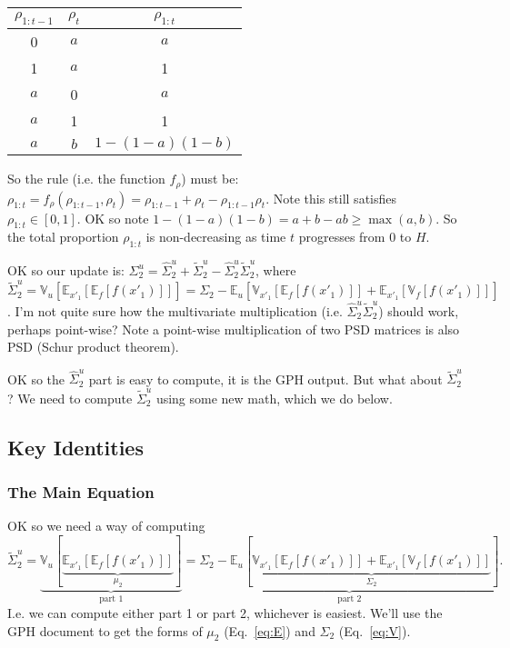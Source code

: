 \documentclass[a4paper,10pt]{article}
\newcommand{\E}{\mathbb{E}}
\newcommand{\V}{\mathbb{V}}
\begin{document}
\begin{itemize}
 \begin{tabular}{ c | c || c }
  \hline
  $\rho_{1:t-1}$ & $\rho_{t}$ & $\rho_{1:t}$ \\
  \hline
  0 & $a$ & $a$ \\
  1 & $a$ & 1 \\
  $a$ & 0 & $a$ \\
  $a$ & 1 & 1 \\
  $a$ & $b$ & $1-(1-a)(1-b)$ \\
  \hline
 \end{tabular}

 So the rule (i.e. the function $f_\rho$) must be:
 $\rho_{1:t} = f_\rho(\rho_{1:t-1},\rho_{t}) = \rho_{1:t-1} + \rho_{t} - \rho_{1:t-1}\rho_{t}$.
 Note this still satisfies $\rho_{1:t}\in[0,1]$.
 OK so note $1-(1-a)(1-b) = a+b-ab \geq \max(a,b)$.
 So the total proportion $\rho_{1:t}$ is non-decreasing
 as time $t$ progresses from $0$ to $H$.

 OK so our update is:
 $\Sigma^{u}_2 = \hat{\Sigma}^{u}_2 + \tilde{\Sigma}^{u}_2 - \hat{\Sigma}^{u}_2 \tilde{\Sigma}^{u}_2$,
 where $\tilde{\Sigma}^{u}_2 = \V_u[\E_{x'_1}[\E_f[f(x'_1)]]] =
 \Sigma_2-\E_u[\V_{x'_1}[\E_f[f(x'_1)]] + \E_{x'_1}[\V_f[f(x'_1)]]]$.
 I'm not quite sure how the multivariate multiplication (i.e. $\hat{\Sigma}^{u}_2 \tilde{\Sigma}^{u}_2$)
 should work, perhaps point-wise?
 Note a point-wise multiplication of two PSD matrices is also PSD (Schur product theorem). %

 OK so the $\hat{\Sigma}^{u}_2$ part is easy to compute,
 it is the GPH output.
 But what about $\tilde{\Sigma}^{u}_2$?
 We need to compute $\tilde{\Sigma}^{u}_2$ using some new math,
 which we do below.

\end{itemize}

\subsection{Key Identities}

\subsubsection{The Main Equation}

OK so we need a way of computing
\begin{equation} %
\tilde{\Sigma}^{u}_2 = \underbrace{\V_u[\underbrace{\E_{x'_1}[\E_f[f(x'_1)]]}_{\mu_2}]}_{\text{part 1}} =
 \underbrace{\Sigma_2-\E_u[\underbrace{\V_{x'_1}[\E_f[f(x'_1)]] + \E_{x'_1}[\V_f[f(x'_1)]]}_{\Sigma_2}]}_{\text{part 2}}.
 \end{equation}
I.e. we can compute either part 1 or part 2, whichever is easiest.
We'll use the GPH document to get the forms of
$\mu_2$ (Eq.~\ref{eq:E}) and $\Sigma_2$ (Eq.~\ref{eq:V}).
\end{document}
